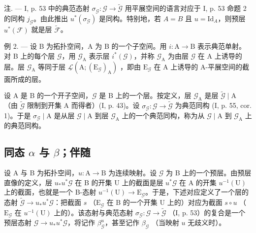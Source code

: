 注. --- I, p. 53 中的典范态射 \(\sigma_{\mathcal{G}}\colon\mathcal{G}\to\widetilde{\mathcal{G}}\) 用平展空间的语言对应于 I, p. 53 命题 2 的同构 \(j_{\mathcal{G}}\)。由此推出 \(u^{*}(\sigma_{\mathcal{G}})\) 是同构。特别地，若 \(A = B\) 且 \(u = \mathrm{Id}_A\)，则预层 \(u^{*}(\mathcal{F})\) 就是层 \(\widetilde{\mathcal{F}}\)。

例 2. --- 设 B 为拓扑空间，A 为 B 的一个子空间。用 \(i\colon\mathrm{A}\to\mathrm{B}\) 表示典范单射。对 B 上的每个层 \(\mathcal{G}\)，用 \(\mathcal{G}_{\mathrm{A}}\) 表示层 \(i^{*}(\mathcal{G})\)，并称 \(\mathcal{G}_{\mathrm{A}}\) 为由层 \(\mathcal{G}\) 在 A 上诱导的层。层 \(\mathcal{G}_{\mathrm{A}}\) 等同于层 \(\underline{\mathcal{L}}(\mathrm{A};(\mathrm{E}_{\mathcal{G}})_{\mathrm{A}})\) ，即由 \(\mathrm{E}_{\mathcal{G}}\) 在 A 上诱导的 A-平展空间的截面所成的层。

设 A 是 B 的一个开子空间，\(\mathcal{G}\) 是 B 上的一个层。按定义，层 \(\mathcal{G}_{\mathrm{A}}\) 是层 \(\widetilde{\mathcal{G}}\mid \mathrm{A}\) （由 \(\widetilde{\mathcal{G}}\) 限制到开集 A 而得者）(I, p. 43)。设 \(\sigma_{\mathcal{G}}\colon \mathcal{G}\to \widetilde{\mathcal{G}}\) 为典范同构 (I, p. 55, cor. 1)。于是 \(\sigma_{\mathcal{G}}\mid \mathrm{A}\) 是从层 \(\mathcal{G}\mid \mathrm{A}\) 到层 \(\mathcal{G}_{\mathrm{A}}\) 上的一个典范同构，称为从 \(\mathcal{G}\mid \mathrm{A}\) 到 \(\mathcal{G}_{\mathrm{A}}\) 上的典范同构。

\subsection{\texorpdfstring{同态 \(\alpha\) 与 \(\beta\)；伴随}{同态 alpha 与 beta；伴随}}

设 A 与 B 为拓扑空间，\(u\colon\mathrm{A}\to\mathrm{B}\) 为连续映射。设 \(\mathcal{G}\) 为 B 上的一个预层。由预层直像的定义，层 \(u_{*}u^{*}\mathcal{G}\) 在 B 的开集 U 上的截面是层 \(u^{*}\mathcal{G}\) 在 A 的开集 \(u^{-1}(\mathrm{U})\) 上的截面，也就是一个 B-态射 \(u^{-1}(\mathrm{U})\to\mathrm{E}_{\mathcal{G}}\)。于是，下述对应定义了一个层的态射 \(\widetilde{\mathcal{G}}\to u_{*}u^{*}\mathcal{G}\)：把截面 \(s\) （\(\mathrm{E}_{\mathcal{G}}\) 在 B 的一个开集 U 上的）对应为截面 \(s\circ u\) （\(\mathrm{E}_{\mathcal{G}}\) 在 \(u^{-1}(\mathrm{U})\) 上的）。该态射与典范态射 \(\sigma_{\mathcal{G}}\colon\mathcal{G}\to\widetilde{\mathcal{G}}\) （I, p. 53）的复合是一个预层态射 \(\mathcal{G}\to u_{*}u^{*}\mathcal{G}\)，将记作 \(\beta_{\mathcal{G}}^{u}\)，甚至记作 \(\beta_{\mathcal{G}}\) （当映射 \(u\) 无歧义时）。

